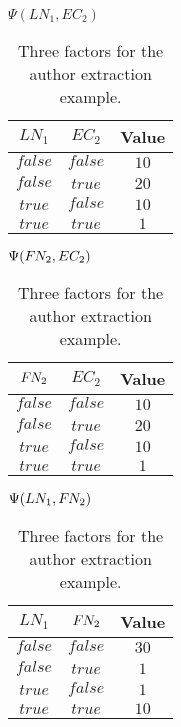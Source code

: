 \begin{table}[t]
\begin{minipage}{0.5\linewidth}
\centering
$\Psi(LN_1,EC_2)$\par
\smallskip
\begin{tabular}{c c c}
 \toprule
 $LN_1$ & $EC_2$ & Value \\
 \midrule
 $\mathit{false}$ & $\mathit{false}$ & $10$ \\
 $\mathit{false}$ & $\mathit{true}$ & $20$ \\
 $\mathit{true}$ & $\mathit{false}$ & $10$ \\
 $\mathit{true}$ & $\mathit{true}$ & $1$ \\
 \bottomrule
\end{tabular}
\end{minipage}
\hfill
\begin{minipage}{0.5\linewidth}
\centering
$\Psi(F\hspace{-0.07em} N_2,EC_2)$\par
\smallskip
\begin{tabular}{c c c}
 \toprule
 $F\hspace{-0.07em} N_2$ & $EC_2$ & Value \\
 \midrule
 $\mathit{false}$ & $\mathit{false}$ & $10$ \\
 $\mathit{false}$ & $\mathit{true}$ & $20$ \\
 $\mathit{true}$ & $\mathit{false}$ & $10$ \\
 $\mathit{true}$ & $\mathit{true}$ & $1$ \\
 \bottomrule
\end{tabular}
\end{minipage}
\medskip
\begin{center}
$\Psi(LN_1,F\hspace{-0.07em} N_2)$\par
\smallskip
\begin{tabular}{c c c}
 \toprule
 $LN_1$ & $F\hspace{-0.07em} N_2$ & Value \\
 \midrule
 $\mathit{false}$ & $\mathit{false}$ & $30$ \\
 $\mathit{false}$ & $\mathit{true}$ & $1$ \\
 $\mathit{true}$ & $\mathit{false}$ & $1$ \\
 $\mathit{true}$ & $\mathit{true}$ & $10$ \\
 \bottomrule
\end{tabular}
\end{center}
\caption{Three factors for the author extraction example.}
\label{tab:example-factors}
\end{table}

\bigskip

